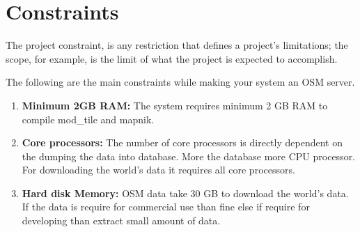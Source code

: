 \section{Constraints}
   
  The project  constraint, is any restriction that defines a project's limitations; the scope, for example, is the limit of what the project is expected to accomplish. 

The following are the main constraints while making your system an OSM server.

\begin{enumerate}
    \item \textbf{Minimum 2GB RAM:} The system requires minimum 2 GB RAM to compile mod\_tile and mapnik.
   
    \item \textbf{Core processors:} The number of core processors is directly dependent on the dumping the data into database. More the database more CPU processor. For downloading the world's data it requires all core processors.
   
    \item \textbf{Hard disk Memory:} OSM data take 30 GB to download the world's data. If the data is require for commercial use than fine else if require for developing than extract small amount of data.
   
   
\end{enumerate}  
